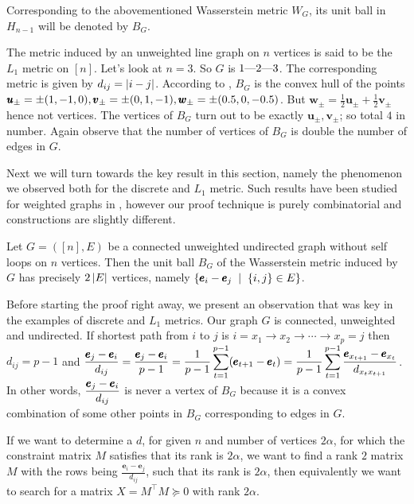 Corresponding to the abovementioned Wasserstein metric $W_{G}$, its unit ball in $H_{n-1}$ will be denoted by $B_{G}$.

\begin{ex}
The metric induced by an unweighted line graph on $n$ vertices is said to be the $L_{1}$ metric on $[n]$. Let's look at $n=3$. So $G$ is $1\text{\textemdash}2\text{\textemdash}3$. The corresponding metric is given by $d_{ij}=\left| i-j \right|$. According to , $B_{G}$ is the convex hull of the points $\displaystyle \pmb u_{\pm} = \pm(1,-1,0), \pmb v_{\pm}=\pm (0,1,-1), \pmb w_{\pm}=\pm(0.5,0,-0.5)$. But $\pmb w_{\pm} = \frac12 \pmb u_{\pm} +\frac12\pmb v_{\pm}$ hence not vertices. The vertices of $B_{G}$ turn out to be exactly $\pmb u_{\pm},\pmb v_{\pm}$; so total $4$ in number. Again observe that the number of vertices of $B_{G}$ is double the number of edges in $G$.
\end{ex}

Next we will turn towards the key result in this section, namely the phenomenon we observed both for the discrete and $L_{1}$ metric. Such results have been studied for weighted graphs in \cite[Theorem 2, \S 3.1]{finitemetric}, however our proof technique is purely combinatorial and constructions are slightly different.

\begin{thm}
Let $G=([n],E)$ be a connected unweighted undirected graph without self loops on $n$ vertices. Then the unit ball $B_{G}$ of the Wasserstein metric induced by $G$ has precisely $2\left| E \right|$ vertices, namely $\set{\pmb e_{i}-\pmb e_{j}\st \set{i,j}\in E}$.
\end{thm}

Before starting the proof right away, we present an observation that was key in the examples of discrete and $L_{1}$ metrics. Our graph $G$ is connected, unweighted and undirected. If shortest path from $i$ to $j$ is $i = x_{1} \to x_{2}\to\cdots \to x_{p}=j$ then $d_{ij} = p-1$  and $\displaystyle\frac{\pmb e_{j}-\pmb e_{i}}{d_{ij}} = \frac{\pmb e_{j}-\pmb e_{i}}{p-1} = \frac{1}{p-1} \sum\limits_{t=1}^{p-1}(\pmb e_{t+1}-\pmb e_{t}) = \frac{1}{p-1} \sum\limits_{t=1}^{p-1} \frac{\pmb e_{x_{t+1}}-\pmb e_{x_{t}}}{d_{x_{t}x_{t+1}}}$. In other words, $\displaystyle\frac{\pmb e_{j}-\pmb e_{i}}{d_{ij}}$ is never a vertex of $B_{G}$ because it is a convex combination of some other points in $B_{G}$ corresponding to edges in $G$.

{\color{red}If we want to determine a $d$, for given $n$ and number of vertices $2\alpha$, for which the constraint matrix $M$ satisfies that its rank is $2\alpha$, we want to find a rank $2$ matrix $M$ with the rows being $\frac{\pmb e_{i}-\pmb e_{j}}{d_{ij}}$, such that its rank is $2\alpha$, then equivalently we want to search for a matrix $X=M^{\top}M\succeq 0$ with rank $2\alpha$.}


